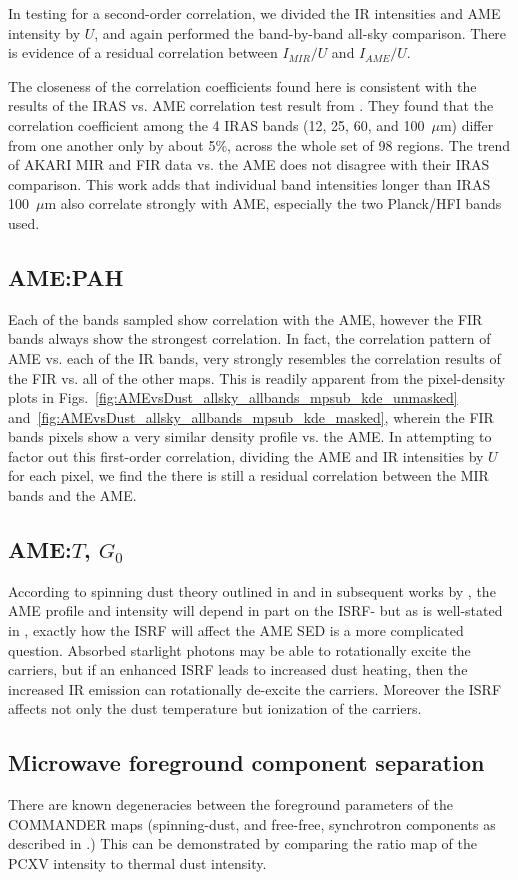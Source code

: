          In testing for a second-order correlation, we divided the IR intensities and AME intensity by $U$, and again performed the band-by-band all-sky comparison. There is evidence of a residual correlation between $I_{MIR}/U$ and $I_{AME}/U$.

       The closeness of the correlation coefficients found here is consistent with the results of the IRAS vs. AME correlation test result from \cite{planckXV}. They found that the correlation coefficient among the 4 IRAS bands (12, 25, 60, and 100~$\mu$m) differ from one another only by about 5\%, across the whole set of 98 regions. The trend of AKARI MIR and FIR data vs. the AME does not disagree with their IRAS comparison. This work adds that individual band intensities longer than IRAS 100~$\mu$m also correlate strongly with AME, especially the two Planck/HFI bands used.

          \subsection{AME:PAH}
            Each of the bands sampled show correlation with the AME, however the FIR bands always show the strongest correlation. In fact, the correlation pattern of AME vs. each of the IR bands, very strongly resembles the correlation results of the FIR vs. all of the other maps. This is readily apparent from the pixel-density plots in Figs.~\ref{fig:AMEvsDust_allsky_allbands_mpsub_kde_unmasked} and~\ref{fig:AMEvsDust_allsky_allbands_mpsub_kde_masked}, wherein the FIR bands pixels show a very similar density profile vs. the AME. In attempting to factor out this first-order correlation, dividing the AME and IR intensities by $U$ for each pixel, we find the there is still a residual correlation between the MIR bands and the AME.

          \subsection{AME:$T$, $G_{0}$}
            According to spinning dust theory outlined in \cite{draine98a} and in subsequent works by \cite{ysard10a}, the AME profile and intensity will depend in part on the ISRF- but as is well-stated in \cite{hensley17a}, exactly how the ISRF will affect the AME SED is a more complicated question. Absorbed starlight photons may be able to rotationally excite the carriers, but if an enhanced ISRF leads to increased dust heating, then the increased IR emission can rotationally de-excite the carriers. Moreover the ISRF affects not only the dust temperature but ionization of the carriers.

          \subsection{Microwave foreground component separation}

            There are known degeneracies between the foreground parameters of the COMMANDER maps (spinning-dust, and free-free, synchrotron components as described in \cite{planck15X}.) This can be demonstrated by comparing the ratio map of the PCXV intensity to thermal dust intensity.
